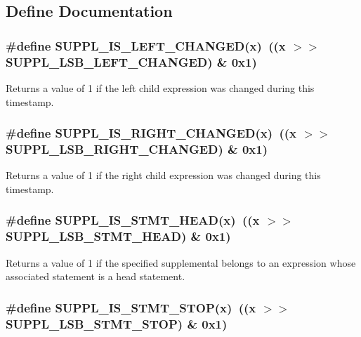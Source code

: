 \subsection{Define Documentation}
\subsubsection{\setlength{\rightskip}{0pt plus 5cm}\#define SUPPL\_\-IS\_\-LEFT\_\-CHANGED(x)\ ((x $>$$>$ SUPPL\_\-LSB\_\-LEFT\_\-CHANGED) \& 0x1)}\label{group__expr__suppl_a16}


Returns a value of 1 if the left child expression was changed during this timestamp. 
\subsubsection{\setlength{\rightskip}{0pt plus 5cm}\#define SUPPL\_\-IS\_\-RIGHT\_\-CHANGED(x)\ ((x $>$$>$ SUPPL\_\-LSB\_\-RIGHT\_\-CHANGED) \& 0x1)}\label{group__expr__suppl_a17}


Returns a value of 1 if the right child expression was changed during this timestamp. 
\subsubsection{\setlength{\rightskip}{0pt plus 5cm}\#define SUPPL\_\-IS\_\-STMT\_\-HEAD(x)\ ((x $>$$>$ SUPPL\_\-LSB\_\-STMT\_\-HEAD) \& 0x1)}\label{group__expr__suppl_a12}


Returns a value of 1 if the specified supplemental belongs to an expression whose associated statement is a head statement. 
\subsubsection{\setlength{\rightskip}{0pt plus 5cm}\#define SUPPL\_\-IS\_\-STMT\_\-STOP(x)\ ((x $>$$>$ SUPPL\_\-LSB\_\-STMT\_\-STOP) \& 0x1)}\label{group__expr__suppl_a13}


